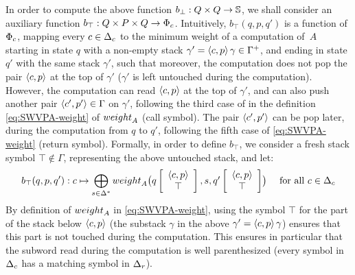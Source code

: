 \noindent
In order to compute the above function $b_\bot : Q \times Q \to \mathbb{S}$,
we shall consider an auxiliary function $b_\top :  Q \times P \times Q \to \Phic$.
%
Intuitively, $b_\top(q, p, q')$ is a function of $\Phic$,
mapping every $c \in \Deltac$ to
the minimum weight of a computation of~$A$
starting in state $q$ with a non-empty stack
$\gamma' = \<c, p> \, \gamma \in \Gamma^+$,
and ending in state $q'$ with the same stack $\gamma'$,
such that moreover,
the computation does not pop the pair $\<c, p>$ at the top of $\gamma'$
(\ie $\gamma'$ is left untouched during the computation).
However, the computation can read $\<c, p>$ at the top of $\gamma'$,
and can also push another pair $\< c', p'> \in \Gamma$ on $\gamma'$,
following the third case of
in the definition \eqref{eq:SWVPA-weight} of $\weight_A$ (call symbol).
The pair $\< c', p'>$ can be pop later, during the computation from $q$ to $q'$,
following the fifth case of \eqref{eq:SWVPA-weight} (return symbol).
%
%
Formally, in order to define $b_\top$, we consider
a fresh stack symbol $\top \notin \Gamma$,   %
representing the above untouched stack, and let:
%
\begin{equation}\label{eq:btop}
  b_\top(q, p, q') : c \mapsto \bigoplus_{s\in \Delta^*}
  \textstyle
  \weight_A\bigl(\configup{q}{\< c, p> \stackup \top }, s, \configup{q'}{\<c, p> \stackup \top}\bigr)
\quad
\mathrm{~for~all~} c \in \Deltac
\end{equation}
%
By definition of $\weight_A$ in \eqref{eq:SWVPA-weight},
using the symbol $\top$ for the part of the stack below $\<c, p>$
(\ie the substack $\gamma$ in the above $\gamma' = \<c, p> \, \gamma$)
ensures that this part is not touched during the computation.
%
This ensures in particular that the subword
read during the computation is well parenthesized
(every symbol in $\Deltac$ has a matching symbol in $\Deltar$).


